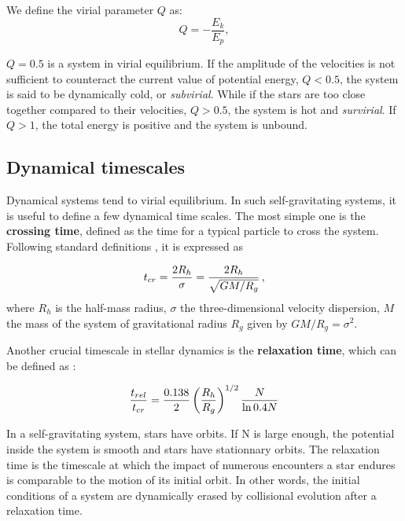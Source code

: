 We define the virial parameter $Q$ as:
\begin{equation}
Q = - \frac{E_k}{E_p},
\end{equation}

$Q=0.5$ is a system in virial equilibrium. If the amplitude of the velocities is not sufficient to counteract the current value of potential energy, $Q<0.5$, the system is said to be dynamically cold, or \textit{subvirial}. While if the stars are too close together compared to their velocities, $Q>0.5$, the system is hot and \textit{survirial}. If $Q>1$, the total energy is positive and the system is unbound. 


\subsection{Dynamical timescales}
\label{Sub:0_timescales}

Dynamical systems tend to virial equilibrium. In such self-gravitating systems, it is useful to define a few dynamical time scales. The most simple one is the \textbf{crossing time}, defined as the time for a typical particle to cross the system. Following standard definitions \citep{Meylan1997,Fleck2006}, it is expressed as 

\begin{equation}
\label{Eq:0_tcr}
     t_{cr} = \frac{2R_h}{\sigma} = \frac{2 R_h}{\sqrt{GM/R_g} } \, ,
\end{equation}
where $R_h$ is the half-mass radius, $\sigma$ the three-dimensional velocity dispersion, $M$ the mass of the system of gravitational radius $R_g$ given by $GM / R_g = \sigma^2$. 

Another crucial timescale in stellar dynamics is the \textbf{relaxation time}, which can be defined as \citep{Heggie2003}:

\begin{equation} 
\label{Eq:0_trel}
\frac{t_{rel}}{t_{cr}} = \frac{0.138}{2} \left(\frac{R_h}{R_g}\right)^{1/2} \frac{N}{\ln 0.4 N}  
\end{equation}

In a self-gravitating system, stars have orbits. If N is large enough, the potential inside the system is smooth and stars have stationnary orbits. The relaxation time is the timescale at which the impact of numerous encounters a star endures is comparable to the motion of its initial orbit. In other words, the initial conditions of a system are dynamically erased by collisional evolution after a relaxation time.

